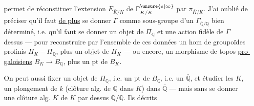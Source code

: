 permet de réconstituer l'extension $E_{\bar K/K}$ de $\Gamma^{\unsure{a|\infty}}_{\bar K/K}$ par $\pi_{\bar K/K}$. J'ai oublié de préciser qu'il faut \uline{de plus} se donner $\Gamma$ comme sous-groupe d'un $\Gamma_{\overline{\mathbb Q}/\mathbb Q}$ bien déterminé, i.e. qu'il faut se donner un objet de $\Pi_{\mathbb Q}$ et une action fidèle de $\Gamma$ dessus --- pour reconstruire par l'ensemble de ces données un hom de groupoïdes profinis $\Pi_K-\Pi_{\mathbb Q}$, plus un objet de $\Pi_K$ --- ou encore, un morphisme de topos \uline{pro-galoisiens} $B_K\longrightarrow B_{\mathbb Q}$, plus un pt de $B_K$.

On peut aussi fixer un objet de $\Pi_{\mathbb Q}$, i.e. un pt de $B_{\mathbb Q}$, i.e. un $\overline{\mathbb Q}$, et étudier les $K$,  un plongement de $k$ (clôture alg. de $\mathbb Q$ dans $K$) dans $\overline{\mathbb Q}$ ---  mais sans se donner une clôture alg. $\bar K$ de $K$ par dessus $\overline{\mathbb Q}/\mathbb Q$. Ils  décrits
